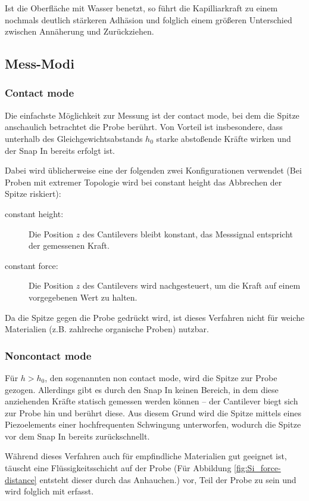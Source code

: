 Ist die Oberfläche mit Wasser benetzt, so führt die Kapilliarkraft zu einem nochmals deutlich stärkeren Adhäsion und folglich einem größeren Unterschied zwischen Annäherung und Zurückziehen.

\subsection{Mess-Modi}
\subsubsection{Contact mode}
Die einfachste Möglichkeit zur Messung ist der contact mode, bei dem die Spitze anschaulich betrachtet die Probe berührt. Von Vorteil ist insbesondere, dass unterhalb des Gleichgewichtsabstands $h_0$ starke abstoßende Kräfte wirken und der Snap In bereits erfolgt ist. 

Dabei wird üblicherweise eine der folgenden zwei Konfigurationen verwendet (Bei Proben mit extremer Topologie wird bei constant height das Abbrechen der Spitze riskiert):
\begin{description}
 \item[constant height:] Die Position $z$ des Cantilevers bleibt konstant, das Messsignal entspricht der gemessenen Kraft.
 \item[constant force:] Die Position $z$ des Cantilevers wird nachgesteuert, um die Kraft auf einem vorgegebenen Wert zu halten.
\end{description}

Da die Spitze gegen die Probe gedrückt wird, ist dieses Verfahren nicht für weiche Materialien (z.B. zahlreche organische Proben) nutzbar.

\subsubsection{Noncontact mode}
Für $h > h_0$, den sogenannten non contact mode, wird die Spitze zur Probe gezogen. Allerdings gibt es durch den Snap In keinen Bereich, in dem diese anziehenden Kräfte statisch gemessen werden können -- der Cantilever biegt sich zur Probe hin und berührt diese. Aus diesem Grund wird die Spitze mittels eines Piezoelements einer hochfrequenten Schwingung unterworfen, wodurch die Spitze vor dem Snap In bereits zurückschnellt.

Während dieses Verfahren auch für empfindliche Materialien gut geeignet ist, täuscht eine Flüssigkeitsschicht auf der Probe (Für Abbildung \ref{fig:Si_force-distance} entsteht dieser durch das Anhauchen.) vor, Teil der Probe zu sein und wird folglich   mit erfasst.

